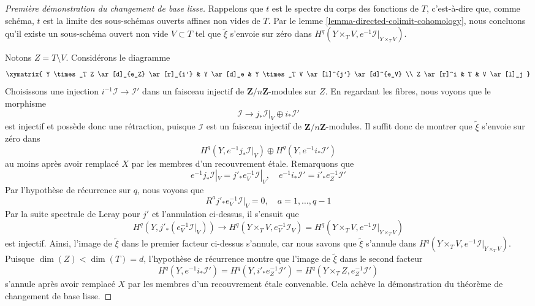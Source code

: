 \begin{proof}[Première démonstration du changement de base lisse]
\medskip\noindent
Rappelons que $t$ est le spectre du corps des fonctions de $T$, c'est-à-dire
que, comme schéma, $t$ est la limite des sous-schémas ouverts affines non vides de $T$.
Par le lemme \ref{lemma-directed-colimit-cohomology}, nous concluons qu'il existe
un sous-schéma ouvert non vide $V \subset T$ tel que $\tilde \xi$ s'envoie sur zéro dans
$H^q(Y \times_T V, e^{-1}\mathcal{I}|_{Y \times_T V})$.

\medskip\noindent
Notons $Z = T \setminus V$. Considérons le diagramme
$$
\xymatrix{
Y \times_T Z \ar[d]_{e_Z} \ar[r]_{i'} &
Y \ar[d]_e &
Y \times_T V \ar[l]^{j'} \ar[d]^{e_V} \\
Z \ar[r]^i &
T &
V \ar[l]_j
}
$$
Choisissons une injection $i^{-1}\mathcal{I} \to \mathcal{I}'$
dans un faisceau injectif de $\mathbf{Z}/n\mathbf{Z}$-modules sur $Z$.
En regardant les fibres, nous voyons que le morphisme
$$
\mathcal{I} \to j_*\mathcal{I}|_V \oplus i_*\mathcal{I}'
$$
est injectif et possède donc une rétraction, puisque $\mathcal{I}$ est un faisceau injectif
de $\mathbf{Z}/n\mathbf{Z}$-modules. Il suffit donc de montrer que
$\tilde \xi$ s'envoie sur zéro dans
$$
H^q(Y, e^{-1}j_*\mathcal{I}|_V) \oplus
H^q(Y, e^{-1}i_*\mathcal{I}')
$$
au moins après avoir remplacé $X$ par les membres d'un recouvrement étale.
Remarquons que
$$
e^{-1}j_*\mathcal{I}|_V = j'_*e_V^{-1}\mathcal{I}|_V,\quad
e^{-1}i_*\mathcal{I}' = i'_*e_Z^{-1}\mathcal{I}'
$$
Par l'hypothèse de récurrence sur $q$, nous voyons que
$$
R^aj'_*e_V^{-1}\mathcal{I}|_V = 0, \quad a = 1, \ldots, q - 1
$$
Par la suite spectrale de Leray pour $j'$ et l'annulation
ci-dessus, il s'ensuit que
$$
H^q(Y, j'_*(e_V^{-1}\mathcal{I}|_V))
\longrightarrow
H^q(Y \times_T V, e_V^{-1}\mathcal{I}_V) =
H^q(Y \times_T V, e^{-1}\mathcal{I}|_{Y \times_T V})
$$
est injectif. Ainsi, l'image de $\tilde \xi$ dans le premier facteur
ci-dessus s'annule, car nous savons que $\tilde \xi$ s'annule
dans $H^q(Y \times_T V, e^{-1}\mathcal{I}|_{Y \times_T V})$.
Puisque $\dim(Z) < \dim(T) = d$, l'hypothèse de récurrence montre que l'image de $\tilde \xi$
dans le second facteur
$$
H^q(Y, e^{-1}i_*\mathcal{I}') =
H^q(Y, i'_*e_Z^{-1}\mathcal{I}') =
H^q(Y \times_T Z, e_Z^{-1}\mathcal{I}')
$$
s'annule après avoir remplacé $X$ par les membres d'un recouvrement étale convenable.
Cela achève la démonstration du théorème de changement de base lisse.
\end{proof}


